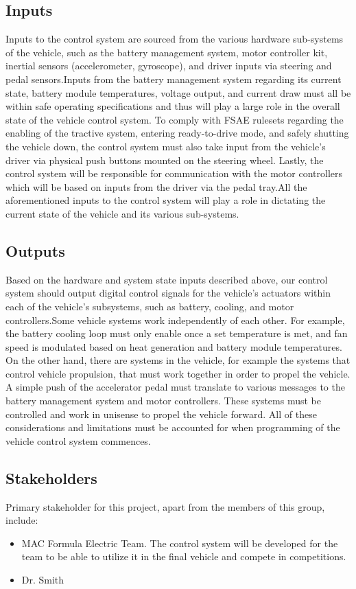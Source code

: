\documentclass{article}
\begin{document}
\subsection{Inputs}
Inputs to the control system are sourced from the various hardware sub-systems 
of the vehicle, such as the battery management system, motor controller kit, 
inertial sensors (accelerometer, gyroscope), and driver inputs via steering 
and pedal sensors.Inputs from the battery management system regarding its 
current state, battery module temperatures, voltage output, and current draw 
must all be within safe operating specifications and thus will play a large 
role in the overall state of the vehicle control system. 
To comply with FSAE rulesets regarding the enabling of the tractive system, 
entering ready-to-drive mode, and safely shutting the vehicle down, the control 
system must also take input from the vehicle’s driver via physical push buttons 
mounted on the steering wheel. Lastly, the control system will be responsible 
for communication with the motor controllers which will be based on inputs from 
the driver via the pedal tray.All the aforementioned inputs to the control system 
will play a role in dictating the current state of the vehicle and its various 
sub-systems.

\subsection{Outputs}
Based on the hardware and system state inputs described above, our control system 
should output digital control signals for the vehicle’s actuators within each of 
the vehicle’s subsystems, such as battery, cooling, and motor controllers.Some 
vehicle systems work independently of each other. For example, the battery cooling 
loop must only enable once a set temperature is met, and fan speed is modulated 
based on heat generation and battery module temperatures. On the other hand, there 
are systems in the vehicle, for example the systems that control vehicle propulsion, 
that must work together in order to propel the vehicle. A simple push of the 
accelerator pedal must translate to various messages to the battery management system 
and motor controllers. These systems must be controlled and work in unisense to 
propel the vehicle forward. All of these considerations and limitations must be 
accounted for when programming of the vehicle control system commences.

\subsection{Stakeholders}
Primary stakeholder for this project, apart from the members of this group, include: 
\begin{itemize}
    \item MAC Formula Electric Team. The control system will be developed for the team to be 
    able to utilize it in the final vehicle and compete in competitions.
    \item Dr. Smith
\end{itemize}
\end{document}
